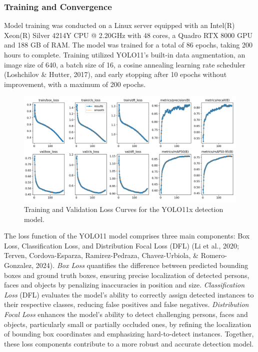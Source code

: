 \documentclass[
  man,floatsintext]{apa6}
\begin{document}
\subsubsection{Training and Convergence}\label{training-face}

Model training was conducted on a Linux server equipped with an Intel(R) Xeon(R) Silver 4214Y CPU @ 2.20GHz with 48 cores, a Quadro RTX 8000 GPU and 188 GB of RAM. The model was trained for a total of 86 epochs, taking 200 hours to complete. Training utilized YOLO11's built-in data augmentation, an image size of 640, a batch size of 16, a cosine annealing learning rate scheduler (Loshchilov \& Hutter, 2017), and early stopping after 10 epochs without improvement, with a maximum of 200 epochs.

\begin{figure}

{\centering \includegraphics[width=450px]{images/yolo_loss_curves} 

}

\caption{Training and Validation Loss Curves for the YOLO11x detection model.}\label{fig:det-loss-curves}
\end{figure}

The loss function of the YOLO11 model comprises three main components: Box Loss, Classification Loss, and Distribution Focal Loss (DFL) (Li et al., 2020; Terven, Cordova-Esparza, Ramirez-Pedraza, Chavez-Urbiola, \& Romero-Gonzalez, 2024). \emph{Box Loss} quantifies the difference between predicted bounding boxes and ground truth boxes, ensuring precise localization of detected persons, faces and objects by penalizing inaccuracies in position and size. \emph{Classification Loss} (DFL) evaluates the model's ability to correctly assign detected instances to their respective classes, reducing false positives and false negatives. \emph{Distribution Focal Loss} enhances the model's ability to detect challenging persons, faces and objects, particularly small or partially occluded ones, by refining the localization of bounding box coordinates and emphasizing hard-to-detect instances. Together, these loss components contribute to a more robust and accurate detection model.
\end{document}
